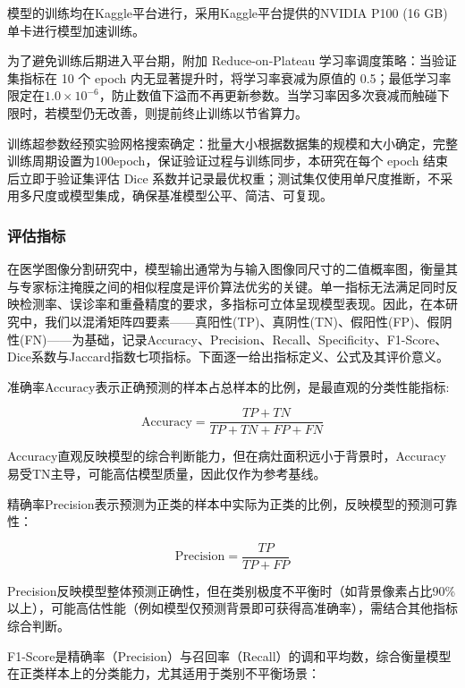 模型的训练均在Kaggle平台进行，采用Kaggle平台提供的NVIDIA P100 (16 GB) 单卡进行模型加速训练。

为了避免训练后期进入平台期，附加 Reduce-on-Plateau 学习率调度策略：当验证集指标在 10 个 epoch 内无显著提升时，将学习率衰减为原值的 0.5；最低学习率限定在$ 1.0 \times 10^{-6} $，防止数值下溢而不再更新参数。当学习率因多次衰减而触碰下限时，若模型仍无改善，则提前终止训练以节省算力。

训练超参数经预实验网格搜索确定：批量大小根据数据集的规模和大小确定，完整训练周期设置为100epoch，保证验证过程与训练同步，本研究在每个 epoch 结束后立即于验证集评估 Dice 系数并记录最优权重；测试集仅使用单尺度推断，不采用多尺度或模型集成，确保基准模型公平、简洁、可复现。

\subsubsection{评估指标}

在医学图像分割研究中，模型输出通常为与输入图像同尺寸的二值概率图，衡量其与专家标注掩膜之间的相似程度是评价算法优劣的关键。单一指标无法满足同时反映检测率、误诊率和重叠精度的要求，多指标可立体呈现模型表现。因此，在本研究中，我们以混淆矩阵四要素——真阳性(TP)、真阴性(TN)、假阳性(FP)、假阴性(FN)——为基础，记录Accuracy、Precision、Recall、Specificity、F1-Score、Dice系数与Jaccard指数七项指标。下面逐一给出指标定义、公式及其评价意义。

准确率Accuracy表示正确预测的样本占总样本的比例，是最直观的分类性能指标:

\begin{equation}
    \mathrm{Accuracy}=\frac{TP+TN}{TP+TN+FP+FN}
\end{equation}

Accuracy直观反映模型的综合判断能力，但在病灶面积远小于背景时，Accuracy易受TN主导，可能高估模型质量，因此仅作为参考基线。

精确率Precision表示预测为正类的样本中实际为正类的比例，反映模型的预测可靠性：

\begin{equation}
    \mathrm{Precision}=\frac{T P}{T P+F P}
\end{equation}

Precision反映模型整体预测正确性，但在类别极度不平衡时（如背景像素占比90\%以上），可能高估性能（例如模型仅预测背景即可获得高准确率），需结合其他指标综合判断。

F1-Score是精确率（Precision）与召回率（Recall）的调和平均数，综合衡量模型在正类样本上的分类能力，尤其适用于类别不平衡场景：

